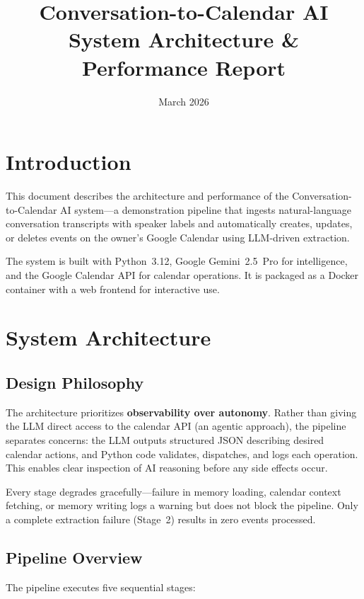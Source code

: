 \documentclass[12pt]{article}
\title{Conversation-to-Calendar AI\\[0.5em]
\large System Architecture \& Performance Report}
\author{}
\date{March 2026}
\begin{document}
\maketitle
\tableofcontents
\newpage

\section{Introduction}

This document describes the architecture and performance of the
Conversation-to-Calendar AI system---a demonstration pipeline that ingests
natural-language conversation transcripts with speaker labels and
automatically creates, updates, or deletes events on the owner's Google
Calendar using LLM-driven extraction.

The system is built with Python~3.12, Google Gemini~2.5~Pro for
intelligence, and the Google Calendar API for calendar operations. It is
packaged as a Docker container with a web frontend for interactive use.

\section{System Architecture}

\subsection{Design Philosophy}

The architecture prioritizes \textbf{observability over autonomy}. Rather
than giving the LLM direct access to the calendar API (an agentic
approach), the pipeline separates concerns: the LLM outputs structured
JSON describing desired calendar actions, and Python code validates,
dispatches, and logs each operation. This enables clear inspection of AI
reasoning before any side effects occur.

Every stage degrades gracefully---failure in memory loading, calendar
context fetching, or memory writing logs a warning but does not block the
pipeline. Only a complete extraction failure (Stage~2) results in zero
events processed.

\subsection{Pipeline Overview}

The pipeline executes five sequential stages:
\end{document}
